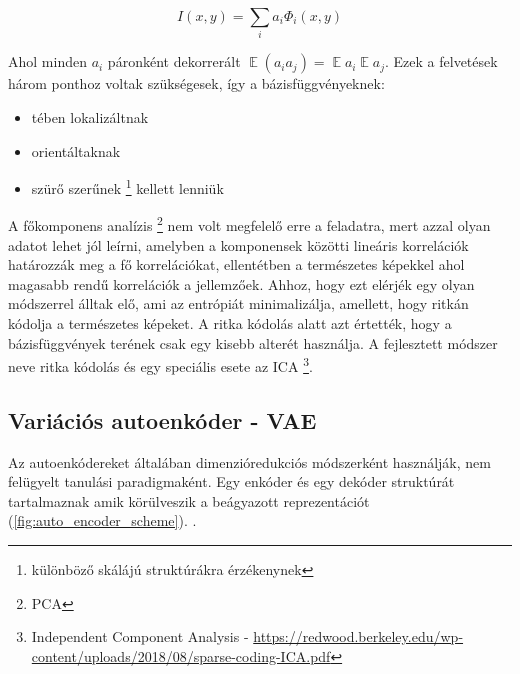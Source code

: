 \documentclass[12pt, english]{article}
\DeclareMathOperator*{\E}{\mathbb{E}}
\begin{document}
\vspace{4mm}

\begin{equation}
    I(x, y) = \sum_{i}a_i \Phi_{i}(x, y)
\end{equation}

\vspace{4mm}

\par Ahol minden $a_{i}$ páronként dekorrerált $\E (a_i a_j) = \E a_i \E a_j$. Ezek a felvetések három ponthoz voltak szükségesek, így a bázisfüggvényeknek:

\vspace{4mm}

\begin{itemize}
    \item tében lokalizáltnak
    \item orientáltaknak
    \item szürő szerűnek \footnote{különböző skálájú struktúrákra érzékenynek} kellett lenniük
\end{itemize}

\vspace{4mm}

\par A főkomponens analízis \footnote{PCA} nem volt megfelelő erre a feladatra, mert azzal olyan adatot lehet jól leírni, amelyben a komponensek közötti lineáris korrelációk határozzák meg a fő korrelációkat, ellentétben a természetes képekkel ahol magasabb rendű korrelációk a jellemzőek. Ahhoz, hogy ezt elérjék egy olyan módszerrel álltak elő, ami az entrópiát minimalizálja, amellett, hogy ritkán kódolja a természetes képeket. A ritka kódolás alatt azt értették, hogy a bázisfüggvények terének csak egy kisebb alterét használja. A fejlesztett módszer neve ritka kódolás és egy speciális esete az ICA \footnote{Independent Component Analysis - \url{https://redwood.berkeley.edu/wp-content/uploads/2018/08/sparse-coding-ICA.pdf}}.

\vspace{5mm}

\subsection{Variációs autoenkóder - VAE}

\vspace{5mm}

\par Az autoenkódereket általában dimenzióredukciós módszerként használják, nem felügyelt tanulási paradigmaként. Egy enkóder és egy dekóder struktúrát tartalmaznak amik körülveszik a beágyazott reprezentációt (\ref{fig:auto_encoder_scheme}). .
\end{document}
